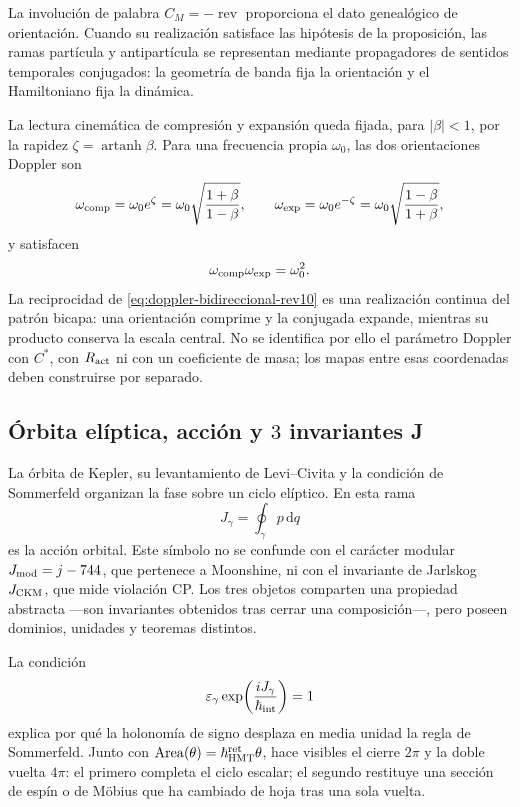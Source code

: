 La involución de palabra \(C_M=-\operatorname{rev}\) proporciona el dato
genealógico de orientación. Cuando su realización satisface las hipótesis de
la proposición, las ramas partícula y antipartícula se representan mediante
propagadores de sentidos temporales conjugados: la geometría de banda fija la
orientación y el Hamiltoniano fija la dinámica.

La lectura cinemática de compresión y expansión queda fijada, para
\(|\beta|<1\), por la rapidez
\(\zeta=\operatorname{artanh}\beta\). Para una frecuencia propia
\(\omega_0\), las dos orientaciones Doppler son
\begin{equation}
 \omega_{\rm comp}=\omega_0e^{\zeta}
 =\omega_0\sqrt{\frac{1+\beta}{1-\beta}},\qquad
 \omega_{\rm exp}=\omega_0e^{-\zeta}
 =\omega_0\sqrt{\frac{1-\beta}{1+\beta}},
 \label{eq:doppler-bidireccional-rev10}
\end{equation}
y satisfacen
\[
 \omega_{\rm comp}\omega_{\rm exp}=\omega_0^2.
\]
La reciprocidad de \eqref{eq:doppler-bidireccional-rev10} es una realización
continua del patrón bicapa: una orientación comprime y la conjugada expande,
mientras su producto conserva la escala central. No se identifica por ello
el parámetro Doppler con \(C^*\), con \(R_{\rm act}\) ni con un coeficiente
de masa; los mapas entre esas coordenadas deben construirse por separado.

\subsection{Órbita elíptica, acción y \(3\) invariantes J}

La órbita de Kepler, su levantamiento de Levi--Civita y la condición de
Sommerfeld organizan la fase sobre un ciclo elíptico. En esta rama
\[
 J_\gamma=\oint_\gamma p\,\mathrm dq
\]
es la acción orbital. Este símbolo no se confunde con el carácter modular
\(J_{\rm mod}=j-744\), que pertenece a Moonshine, ni con el invariante de
Jarlskog \(J_{\rm CKM}\), que mide violación CP. Los tres objetos comparten
una propiedad abstracta ---son invariantes obtenidos tras cerrar una
composición---, pero poseen dominios, unidades y teoremas distintos.

La condición
\[
 \varepsilon_\gamma
 \exp\!\left(\frac{iJ_\gamma}{\hbar_{\rm int}}\right)=1
\]
explica por qué la holonomía de signo desplaza en media unidad la regla de
Sommerfeld. Junto con
\(\operatorname{Area}(\theta)=\hbar_{\rm HMT}^{\rm ret}\theta\), hace
visibles el cierre \(2\pi\) y la doble vuelta \(4\pi\): el primero completa
el ciclo escalar; el segundo restituye una sección de espín o de Möbius que
ha cambiado de hoja tras una sola vuelta.

